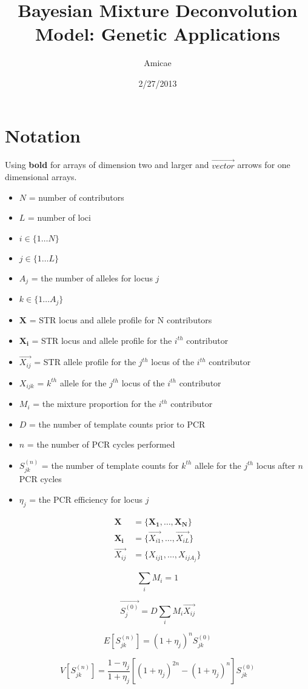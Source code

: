 \documentclass[11pt]{article} %
\title{Bayesian Mixture Deconvolution Model:  Genetic Applications}
\author{Amicae}
\date{2/27/2013}
\begin{document}
\maketitle

\section{Notation}
Using \textbf{bold} for arrays of dimension two and larger and $\vec{vector}$ arrows for one dimensional arrays.
\begin{itemize}
   \item $N$ = number of contributors
   \item $L$ = number of loci
   \item $i \in \{1 \ldots N\}$
   \item $j \in \{1 \ldots L\}$
   \item $A_j$ = the number of alleles for locus $j$
   \item $k \in \{1 \ldots A_j\}$
   \item $\mathbf{X}$ = STR locus and allele profile for N contributors
   \item $\mathbf{X_i}$ = STR locus and allele profile for the $i^{th}$ contributor
   \item $\vec{X_{ij}}$ = STR allele profile for the $j^{th}$ locus of the $i^{th}$ contributor
   \item $X_{ijk}$ = $k^{th}$ allele for the $j^{th}$ locus of the $i^{th}$ contributor
   \item $M_i$ = the mixture proportion for the $i^{th}$ contributor
   \item $D$ = the number of template counts prior to PCR
   \item $n$ = the number of PCR cycles performed
   \item $S_{jk}^{(n)}$ = the number of template counts for $k^{th}$ allele for the $j^{th}$ locus after $n$ PCR cycles
   \item $\eta_j$ = the PCR efficiency for locus $j$
\end{itemize}

\begin{align}
  \mathbf{X} &= \{\mathbf{X_1},\dotsc, \mathbf{X_N} \} \\ 
  \mathbf{X_i} &= \{\vec{X_{i1}},\dotsc, \vec{X_{iL}} \} \\
  \vec{X_{ij}} &= \{X_{ij1},\dotsc, X_{ijA_j} \}
\end{align}

\begin{equation}
  \sum_{i}{M_i} = 1
\end{equation}

\begin{equation}
  \vec{S_{j}^{(0)}} = D\sum_{i}{M_i \vec{X_{ij}}}
\end{equation}

\begin{equation}
  E[S_{jk}^{(n)}] = (1+\eta_j)^n S_{jk}^{(0)}
\end{equation}

\begin{equation}
  V[S_{jk}^{(n)}] = \frac{1-\eta_j}{1+\eta_j} \left[ (1+\eta_j)^{2n}-(1+\eta_j)^n \right] S_{jk}^{(0)}
\end{equation}
\end{document}
